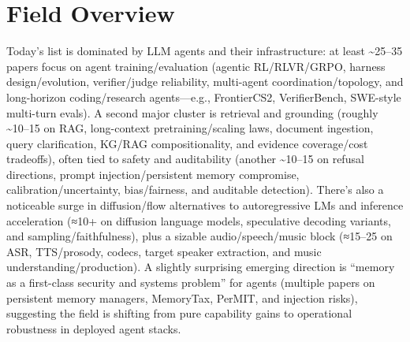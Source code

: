 \documentclass[12pt,letterpaper]{article}
\begin{document}
\section*{Field Overview}
{\footnotesize Today's list is dominated by LLM agents and their infrastructure: at least \textasciitilde{}25--35 papers focus on agent training/evaluation (agentic RL/RLVR/GRPO, harness design/evolution, verifier/judge reliability, multi-agent coordination/topology, and long-horizon coding/research agents---e.g., FrontierCS2, VerifierBench, SWE-style multi-turn evals). A second major cluster is retrieval and grounding (roughly \textasciitilde{}10--15 on RAG, long-context pretraining/scaling laws, document ingestion, query clarification, KG/RAG compositionality, and evidence coverage/cost tradeoffs), often tied to safety and auditability (another \textasciitilde{}10--15 on refusal directions, prompt injection/persistent memory compromise, calibration/uncertainty, bias/fairness, and auditable detection). There's also a noticeable surge in diffusion/flow alternatives to autoregressive LMs and inference acceleration (≈10+ on diffusion language models, speculative decoding variants, and sampling/faithfulness), plus a sizable audio/speech/music block (≈15--25 on ASR, TTS/prosody, codecs, target speaker extraction, and music understanding/production). A slightly surprising emerging direction is ``memory as a first-class security and systems problem'' for agents (multiple papers on persistent memory managers, MemoryTax, PerMIT, and injection risks), suggesting the field is shifting from pure capability gains to operational robustness in deployed agent stacks.}
\end{document}
